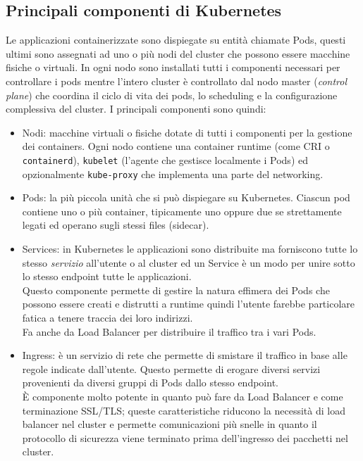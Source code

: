 \documentclass[12pt,a4paper,openright,twoside]{book}
\begin{document}
\subsection{Principali componenti di Kubernetes}
Le applicazioni containerizzate sono dispiegate su entità chiamate Pods, questi ultimi sono assegnati ad uno o più nodi del cluster che possono essere macchine fisiche o virtuali.
In ogni nodo sono installati tutti i componenti necessari per controllare i pods mentre l'intero cluster è controllato dal nodo master (\textit{control plane}) che coordina il ciclo di vita dei pods, lo scheduling e la configurazione complessiva del cluster.
I principali componenti sono quindi:
\begin{itemize}
    \item {
        Nodi: macchine virtuali o fisiche dotate di tutti i componenti per la gestione dei containers. Ogni nodo contiene una container runtime (come CRI o \texttt{containerd}), \texttt{kubelet} (l'agente che gestisce localmente i Pods) ed opzionalmente \texttt{kube-proxy} che implementa una parte del networking.
    }
    \item {
        Pods: la più piccola unità che si può dispiegare su Kubernetes. Ciascun pod contiene uno o più container, tipicamente uno oppure due se strettamente legati ed operano sugli stessi files (sidecar).
    }
    \item {
        Services: in Kubernetes le applicazioni sono distribuite ma forniscono tutte lo stesso \textit{servizio} all'utente o al cluster ed un Service è un modo per unire sotto lo stesso endpoint tutte le applicazioni.\\
        Questo componente permette di gestire la natura effimera dei Pods che possono essere creati e distrutti a runtime quindi l'utente farebbe particolare fatica a tenere traccia dei loro indirizzi.\\
        Fa anche da Load Balancer per distribuire il traffico tra i vari Pods.
    }
    \item {
        Ingress: è un servizio di rete che permette di smistare il traffico in base alle regole indicate dall'utente. Questo permette di erogare diversi servizi provenienti da diversi gruppi di Pods dallo stesso endpoint.\\
        È componente molto potente in quanto può fare da Load Balancer e come terminazione SSL/TLS; queste caratteristiche riducono la necessità di load balancer nel cluster e permette comunicazioni più snelle in quanto il protocollo di sicurezza viene terminato prima dell'ingresso dei pacchetti nel cluster.\\
}
\end{itemize}
\end{document}
